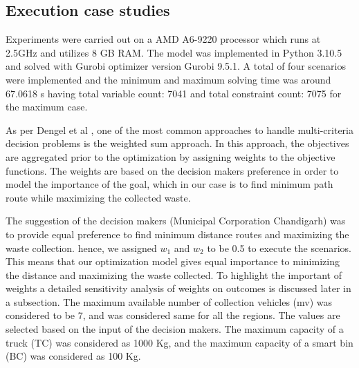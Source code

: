 \documentclass[12pt]{article}
\begin{document}
\subsection{Execution case studies}
Experiments were carried out on a AMD A6-9220 processor which runs at 2.5GHz and utilizes 8 GB RAM. The model was implemented in Python 3.10.5 and solved with Gurobi optimizer version Gurobi 9.5.1. A total of four scenarios were implemented and the minimum and maximum solving time was around 67.0618 s having total variable count: 7041 and total constraint count: 7075 for the maximum case.

As per Dengel et al \cite{degel2015time}, one of the most common approaches to handle multi-criteria decision problems is the weighted sum approach. In this approach, the objectives are aggregated prior to the optimization by assigning weights to the objective functions. The weights are based on the decision makers preference in order to model the importance of the goal, which in our case is to find minimum path route while maximizing the collected waste. 

The suggestion of the decision makers (Municipal Corporation Chandigarh) was to provide equal preference to find minimum distance routes and maximizing the waste collection. hence, we assigned  $w_1$ and $w_2$ to be 0.5 to execute the scenarios. This means that our optimization model gives equal importance to minimizing the distance and maximizing the waste collected. To highlight the important of weights a detailed sensitivity analysis of weights on outcomes is discussed later in a subsection.
The maximum available number of collection vehicles (mv) was considered to be 7, and was considered same for all the regions. The values are selected based on the input of the decision makers. The maximum capacity of a truck (TC) was considered as 1000 Kg, and the maximum capacity of a smart bin (BC) was considered as 100 Kg.
\end{document}
